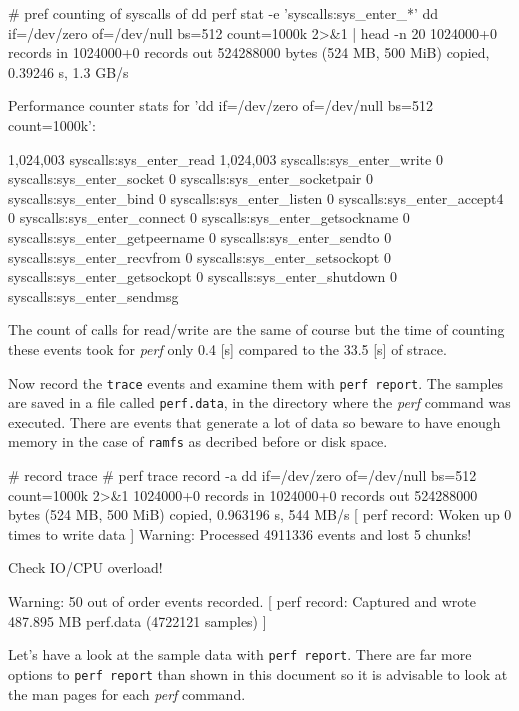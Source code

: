 \starttyping
# pref  counting of syscalls of dd
perf stat -e 'syscalls:sys_enter_*' dd if=/dev/zero of=/dev/null bs=512 count=1000k 2>&1 | head -n 20
1024000+0 records in
1024000+0 records out
524288000 bytes (524 MB, 500 MiB) copied, 0.39246 s, 1.3 GB/s

 Performance counter stats for 'dd if=/dev/zero of=/dev/null bs=512 count=1000k':

         1,024,003      syscalls:sys_enter_read
         1,024,003      syscalls:sys_enter_write
                 0      syscalls:sys_enter_socket
                 0      syscalls:sys_enter_socketpair
                 0      syscalls:sys_enter_bind
                 0      syscalls:sys_enter_listen
                 0      syscalls:sys_enter_accept4
                 0      syscalls:sys_enter_connect
                 0      syscalls:sys_enter_getsockname
                 0      syscalls:sys_enter_getpeername
                 0      syscalls:sys_enter_sendto
                 0      syscalls:sys_enter_recvfrom
                 0      syscalls:sys_enter_setsockopt
                 0      syscalls:sys_enter_getsockopt
                 0      syscalls:sys_enter_shutdown
                 0      syscalls:sys_enter_sendmsg
\stoptyping

The count of calls for read/write are the same of course but the time
of counting these events took for {\em perf} only 0.4 [s] compared to the
33.5 [s] of strace.

Now record the {\tt trace} events and examine them with {\tt perf report}. The
samples are saved in a file called {\tt perf.data}, in the directory where
the {\em perf} command was executed. There are events that generate a lot of
data so beware to have enough memory in the case of {\tt ramfs} as decribed
before or disk space.

\starttyping
# record trace
# perf trace record -a dd if=/dev/zero of=/dev/null bs=512 count=1000k 2>&1
1024000+0 records in
1024000+0 records out
524288000 bytes (524 MB, 500 MiB) copied, 0.963196 s, 544 MB/s
[ perf record: Woken up 0 times to write data ]
Warning:
Processed 4911336 events and lost 5 chunks!

Check IO/CPU overload!

Warning:
50 out of order events recorded.
[ perf record: Captured and wrote 487.895 MB perf.data (4722121 samples) ]
\stoptyping

Let's have a look at the sample data with {\tt perf report}. There are far
more options to {\tt perf report} than shown in this document so it is
advisable to look at the man pages for each {\em perf} command.


